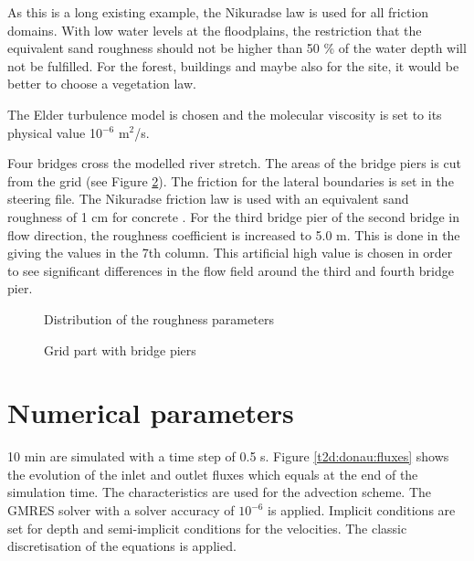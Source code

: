 As this is a long existing example, the Nikuradse law is used for all friction
domains. 
With low water levels at the floodplains, the restriction that the equivalent
sand roughness should not be higher than 50 \% of the water depth will not be
fulfilled.
For the forest, buildings and maybe also for the site, it would be better to
choose a vegetation law.  

The Elder turbulence model is chosen and the molecular viscosity is set to its
physical value 10$^{-6}$ m$^2$/s. 

Four bridges cross the modelled river stretch.
The areas of the bridge piers is cut from the grid (see Figure
\ref{t2d:donau:gridpiers}).
The friction for the lateral boundaries is set in the steering file.
The Nikuradse friction law is used 
with an equivalent sand roughness of 1 cm for concrete
.
For the third bridge pier of the second bridge in flow direction, the roughness
coefficient is increased to 5.0 m.
This is done in the  giving the values in the
7th column.
This artificial high value is chosen in order to see significant differences
in the flow field around the third and fourth bridge pier.

\begin{figure} [h!]
\centering
{}
\caption{Distribution of the roughness parameters}
\label{t2d:donau:friction}
\end{figure}

\begin{figure} [h!]
\centering
{}
\caption{Grid part with bridge piers}
\label{t2d:donau:gridpiers}
\end{figure}

\section{Numerical parameters}
10 min are simulated with a time step of 0.5 s.
Figure \ref{t2d:donau:fluxes} shows the evolution of the inlet and outlet fluxes
which equals at the end of the simulation time.
The characteristics are used for the advection scheme.
The GMRES solver with a solver accuracy of $10^{-6}$ is applied.
Implicit conditions are set for depth and semi-implicit conditions for the velocities.
The classic discretisation of the equations is applied.

